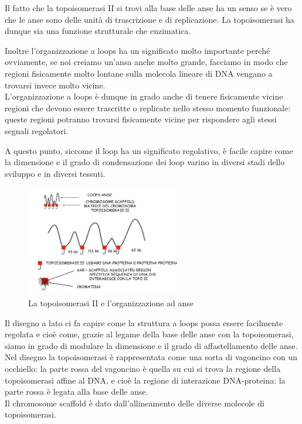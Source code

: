 \documentclass[11pt]{book}
\begin{document}
Il fatto che la topoisomerasi II si trovi alla base delle anse ha un senso se è vero che le anse sono delle unità di trascrizione e di replicazione. La topoisomerasi ha dunque sia una funzione strutturale che enzimatica.
   
 Inoltre l'organizzazione a loops ha un significato molto importante perché ovviamente, se noi creiamo un’ansa anche molto grande, facciamo in modo che regioni fisicamente molto lontane sulla molecola lineare di DNA vengano a trovarsi invece molto vicine.\\
L’organizzazione a loops è dunque in grado anche di tenere fisicamente vicine regioni che devono essere trascritte o replicate nello stesso momento funzionale: queste regioni potranno trovarsi fisicamente vicine per rispondere agli stessi segnali regolatori.

A questo punto, siccome il loop ha un significato regolativo, è facile capire come la dimensione e il grado di condensazione dei loop varino in diversi stadi dello sviluppo e in diversi tessuti.

\begin{figure}
    \includegraphics[width=0.60\textwidth]{img/26_anse.jpg}
  \caption{La topoisomerasi II e l'organizzazione ad anse}
\end{figure}

Il disegno a lato ci fa capire come la struttura a loops possa essere facilmente regolata e cioè come, grazie al legame della base delle anse con la topoisomerasi, siamo in grado di modulare la dimensione e il grado di affastellamento delle anse.\\
Nel disegno la topoisomerasi è rappresentata come una sorta di vagoncino con un occhiello: la parte rossa del vagoncino è quella su cui si trova la regione della topoisomerasi affine al DNA, e cioè la regione di interazione DNA-proteina: la parte rossa è legata alla base delle anse.\\
Il chromosome scaffold è dato dall’allineamento delle diverse molecole di topoisomerasi.
\end{document}
